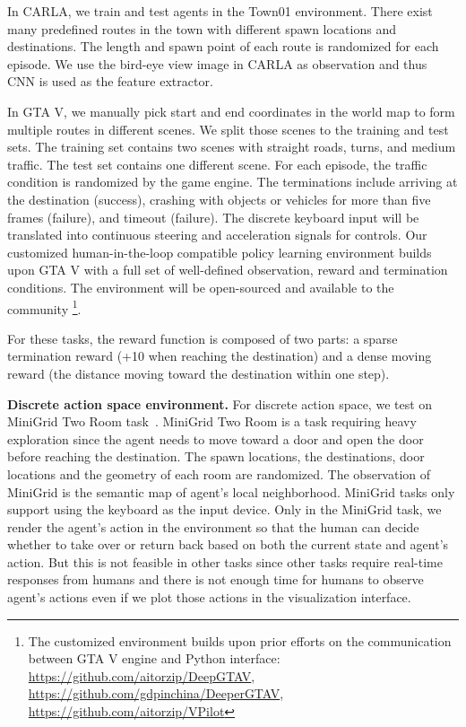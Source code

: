 In CARLA, we train and test agents in the Town01 environment. There exist many predefined routes in the town with different spawn locations and destinations. The length and spawn point of each route is randomized for each episode. We use the bird-eye view image in CARLA as observation and thus CNN is used as the feature extractor.


In GTA V, we manually pick start and end coordinates in the world map to form multiple routes in different scenes.
We split those scenes to the training and test sets.
The training set contains two scenes with straight roads, turns, and medium traffic. The test set contains one different scene. For each episode, the traffic condition is randomized by the game engine. 
The terminations include arriving at the destination (success), crashing with objects or vehicles for more than five frames (failure), and timeout (failure). 
The discrete keyboard input will be translated into continuous steering and acceleration signals for controls.
Our customized human-in-the-loop compatible policy learning environment builds upon GTA V with a full set of well-defined observation, reward and termination conditions. The environment will be open-sourced and available to the community \footnote{The customized environment builds upon prior efforts on the communication between GTA V engine and Python interface:
\url{https://github.com/aitorzip/DeepGTAV}, \url{https://github.com/gdpinchina/DeeperGTAV}, \url{https://github.com/aitorzip/VPilot}}.

For these tasks, the reward function is composed of two parts: a sparse termination reward (+10 when reaching the destination) and a dense moving reward (the distance moving toward the destination within one step).

\textbf{Discrete action space environment.}
For discrete action space, we test on MiniGrid Two Room task~\citep{gym_minigrid}.
MiniGrid Two Room is a task requiring heavy exploration since the agent needs to move toward a door and open the door before reaching the destination. 
The spawn locations, the destinations, door locations and the geometry of each room are randomized.
The observation of MiniGrid is the semantic map of agent's local neighborhood. MiniGrid tasks only support using the keyboard as the input device. Only in the MiniGrid task, we render the agent’s action in the environment so that the human can decide whether to take over or return back based on both the current state and agent's action. But this is not feasible in other tasks since other tasks require real-time responses from humans and there is not enough time for humans to observe agent’s actions even if we plot those actions in the visualization interface. 

